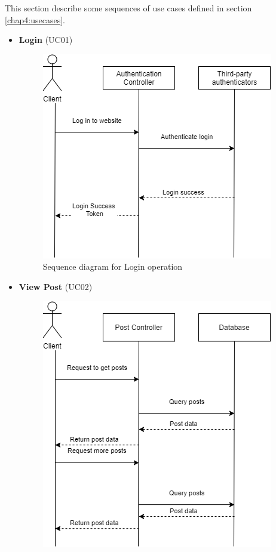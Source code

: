 This section describe some sequences of use cases defined in section \ref{chap4:usecases}.
\begin{itemize}
	\item \textbf{Login} (UC01)
	\begin{center}
		\begin{figure}[H]
		\centering
		\includegraphics[width=0.75\columnwidth]{images/chap4/login_sequence.png}
		\caption{Sequence diagram for Login operation}
		\end{figure}
	\end{center}
	\item \textbf{View Post} (UC02)
	\begin{center}
		\begin{figure}[H]
		\centering
		\includegraphics[width=0.75\columnwidth]{images/chap4/post_sequence.png}

\end{figure}
\end{center}
\end{itemize}

